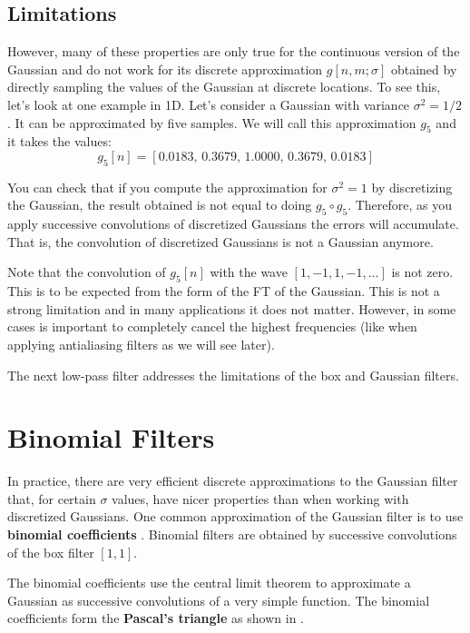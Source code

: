 \subsection{Limitations}

However, many of these properties are only true for the continuous version of the Gaussian and do not work for its discrete approximation $g\left[n,m;\sigma \right]$ obtained by directly sampling the values of the Gaussian at discrete locations. To see this, let's look at one example in 1D. Let's consider a Gaussian with variance $\sigma^2=1/2$. It can be approximated by five samples. We will call this approximation $g_5$ and it takes the values:
\begin{equation}
g_5\left[ n \right] = \left[0.0183, \,    0.3679, \,    1.0000, \,    0.3679, \,    0.0183 \right] 
\end{equation}

You can check that if you compute the approximation for $\sigma^2=1$ by discretizing the Gaussian, the result obtained is not equal to doing $g_5 \circ g_5$. Therefore, as you apply successive convolutions of discretized Gaussians the errors will accumulate. That is, the convolution of discretized Gaussians is not a Gaussian anymore. 

Note that the convolution of $g_5\left[ n \right]$ with the wave $\left[1,-1,1,-1,...\right]$ is not zero. This is to be expected from the form of the FT of the Gaussian. This is not a strong limitation and in many applications it does not matter. However, in some cases is important to completely cancel the highest frequencies (like when applying antialiasing filters as we will see later).

The next low-pass filter addresses the limitations of the box and Gaussian filters.

\section{Binomial Filters}

In practice, there are very efficient discrete approximations to the Gaussian filter that, for certain $\sigma$ values, have nicer properties than when working with discretized Gaussians. One common approximation of the Gaussian filter is to use {\bf binomial coefficients} \cite{Chehikian91}. Binomial filters are obtained by successive convolutions of the box filter $\left[1,1\right]$.

The binomial coefficients use the central limit theorem to approximate a Gaussian as successive convolutions of a very simple function. 
The binomial coefficients form the {\bf Pascal's triangle} as shown in \fig{\ref{fig:pascaltriangle}}.

